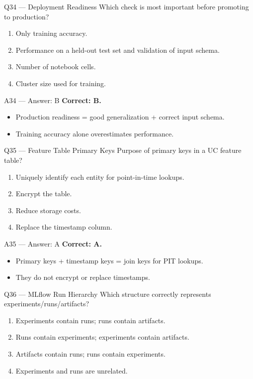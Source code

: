 \documentclass[aspectratio=169,10pt]{beamer}
\begin{document}
	\begin{frame}{Q34 — Deployment Readiness}
		Which check is most important before promoting to production?
		\begin{enumerate}[label=\Alph*.]
			\item Only training accuracy.
			\item Performance on a held-out test set and validation of input schema.
			\item Number of notebook cells.
			\item Cluster size used for training.
		\end{enumerate}
	\end{frame}
	
	\begin{frame}{A34 — Answer: B}
		\textbf{Correct: B.}
		\begin{itemize}
			\item Production readiness = good generalization + correct input schema.
			\item Training accuracy alone overestimates performance.
		\end{itemize}
	\end{frame}
	
	\begin{frame}{Q35 — Feature Table Primary Keys}
		Purpose of primary keys in a UC feature table?
		\begin{enumerate}[label=\Alph*.]
			\item Uniquely identify each entity for point-in-time lookups.
			\item Encrypt the table.
			\item Reduce storage costs.
			\item Replace the timestamp column.
		\end{enumerate}
	\end{frame}
	
	\begin{frame}{A35 — Answer: A}
		\textbf{Correct: A.}
		\begin{itemize}
			\item Primary keys + timestamp keys = join keys for PIT lookups.
			\item They do not encrypt or replace timestamps.
		\end{itemize}
	\end{frame}
	
	\begin{frame}{Q36 — MLflow Run Hierarchy}
		Which structure correctly represents experiments/runs/artifacts?
		\begin{enumerate}[label=\Alph*.]
			\item Experiments contain runs; runs contain artifacts.
			\item Runs contain experiments; experiments contain artifacts.
			\item Artifacts contain runs; runs contain experiments.
			\item Experiments and runs are unrelated.
		\end{enumerate}
	\end{frame}
	
\end{document}
